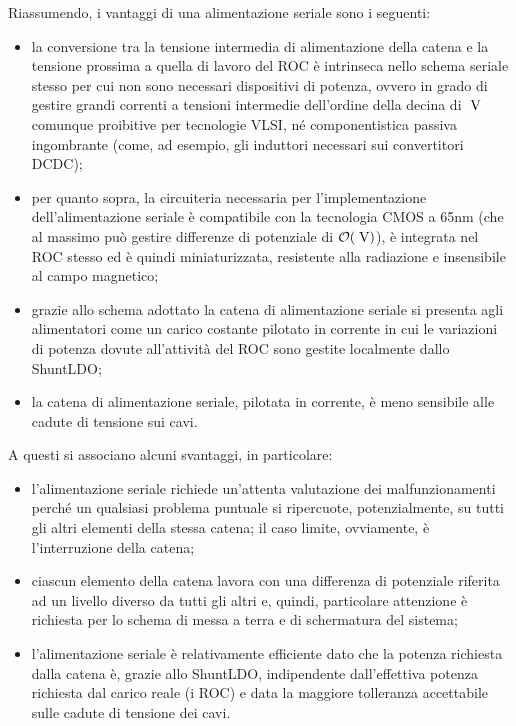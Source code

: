 Riassumendo, i vantaggi di una alimentazione seriale sono i seguenti:
\begin{itemize}
\item la conversione tra la tensione intermedia di alimentazione della catena e la tensione prossima a quella di lavoro del ROC \`e intrinseca nello schema seriale stesso per cui non sono necessari dispositivi di potenza, ovvero in grado di gestire grandi correnti a tensioni intermedie dell'ordine della decina di $\rm \; V$ comunque proibitive per tecnologie VLSI, n\'e componentistica passiva ingombrante (come, ad esempio, gli induttori necessari sui convertitori DCDC);
\item per quanto sopra, la circuiteria necessaria per l'implementazione dell'alimentazione seriale \`e compatibile con la tecnologia CMOS a 65nm (che al massimo pu\`o gestire differenze di potenziale di ${\cal O}(\rm \; V)$), \`e integrata nel ROC stesso ed \`e quindi miniaturizzata, resistente alla radiazione e insensibile al campo magnetico; 
\item grazie allo schema adottato la catena di alimentazione seriale si presenta agli alimentatori come un carico costante pilotato in corrente in cui le variazioni di potenza dovute all'attivit\`a del ROC sono gestite localmente dallo ShuntLDO;
\item la catena di alimentazione seriale, pilotata in corrente, \`e meno sensibile alle cadute di tensione sui cavi.
\end{itemize}
A questi si associano alcuni svantaggi, in particolare:
\begin{itemize}
\item l'alimentazione seriale richiede un'attenta valutazione dei malfunzionamenti perch\'e un qualsiasi problema puntuale si ripercuote, potenzialmente, su tutti gli altri elementi della stessa catena; il caso limite, ovviamente, \`e l'interruzione della catena;
\item ciascun elemento della catena lavora con una differenza di potenziale riferita ad un livello diverso da tutti gli altri e, quindi, particolare attenzione \`e richiesta per lo schema di messa a terra e di schermatura del sistema;
\item l'alimentazione seriale \`e relativamente efficiente dato che la potenza richiesta dalla catena \`e, grazie allo ShuntLDO, indipendente dall'effettiva potenza richiesta dal carico reale (i ROC) e data la maggiore tolleranza accettabile sulle cadute di tensione dei cavi. 
\end{itemize}

